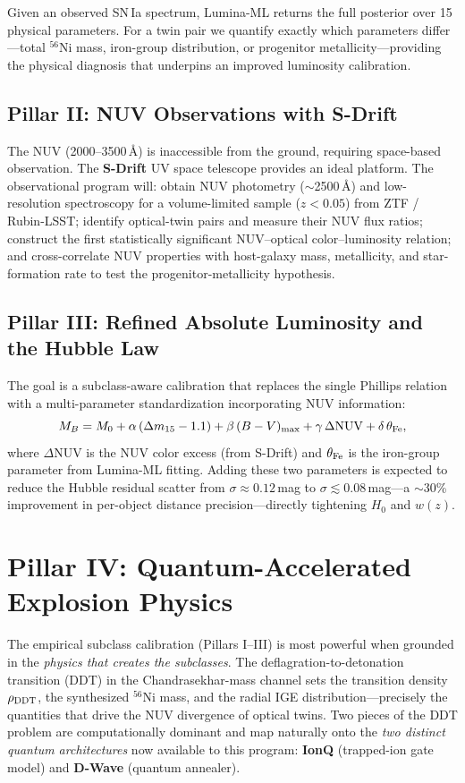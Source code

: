 \documentclass[11pt]{article}
\begin{document}
\begin{appbox}
Given an observed SN\,Ia spectrum, Lumina-ML returns the full posterior over 15 physical
parameters. For a twin pair we quantify exactly which parameters differ---total $^{56}$Ni mass,
iron-group distribution, or progenitor metallicity---providing the physical diagnosis that
underpins an improved luminosity calibration.
\end{appbox}

\subsection{Pillar II: NUV Observations with S-Drift}
The NUV (2000--3500\,\AA) is inaccessible from the ground, requiring space-based observation. The
\textbf{S-Drift} UV space telescope provides an ideal platform. The observational program will:
obtain NUV photometry ($\sim$2500\,\AA) and low-resolution spectroscopy for a volume-limited sample
($z<0.05$) from ZTF / Rubin-LSST; identify optical-twin pairs and measure their NUV flux ratios;
construct the first statistically significant NUV--optical color--luminosity relation; and
cross-correlate NUV properties with host-galaxy mass, metallicity, and star-formation rate to test
the progenitor-metallicity hypothesis.

\subsection{Pillar III: Refined Absolute Luminosity and the Hubble Law}
The goal is a subclass-aware calibration that replaces the single Phillips relation with a
multi-parameter standardization incorporating NUV information:
\begin{equation}
M_B = M_0 + \alpha\,(\Delta m_{15}-1.1) + \beta\,(B-V)_{\max} + \gamma\,\Delta\mathrm{NUV} + \delta\,\theta_{\rm Fe},
\end{equation}
where $\Delta$NUV is the NUV color excess (from S-Drift) and $\theta_{\rm Fe}$ is the iron-group
parameter from Lumina-ML fitting. Adding these two parameters is expected to reduce the Hubble
residual scatter from $\sigma\approx0.12$\,mag to $\sigma\lesssim0.08$\,mag---a $\sim$30\%
improvement in per-object distance precision---directly tightening $H_0$ and $w(z)$.

\section{Pillar IV: Quantum-Accelerated Explosion Physics}
The empirical subclass calibration (Pillars I--III) is most powerful when grounded in the
\emph{physics that creates the subclasses}. The deflagration-to-detonation transition (DDT) in the
Chandrasekhar-mass channel sets the transition density $\rho_{\rm DDT}$, the synthesized $^{56}$Ni
mass, and the radial IGE distribution---precisely the quantities that drive the NUV divergence of
optical twins. Two pieces of the DDT problem are computationally dominant and map naturally onto the
\emph{two distinct quantum architectures} now available to this program: \textbf{IonQ} (trapped-ion
gate model) and \textbf{D-Wave} (quantum annealer).
\end{document}

